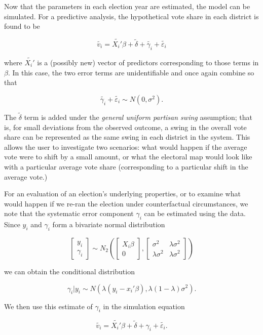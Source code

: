\documentclass[12pt]{article}
\begin{document}
Now that the parameters in each election year are estimated, the model can be simulated. For a predictive analysis, the hypothetical vote share in each district is found to be

\[ \tilde{v_i} = \tilde{X_i'}\beta + \tilde{\delta} + \tilde{\gamma_i} + \tilde{\varepsilon_i} \]

\noindent where $\tilde{X_i'}$ is a (possibly new) vector of predictors corresponding to those terms in $\beta$. In this case, the two error terms are unidentifiable and once again combine so that 

\[ \tilde{\gamma_i} + \tilde{\varepsilon_i} \sim N(0,\sigma^2). \]

The $\tilde{\delta}$ term is added under the \textit{general uniform partisan swing} assumption; that is, for small deviations from the observed outcome, a swing in the overall vote share can be represented as the same swing in each district in the system. This allows the user to investigate two scenarios: what would happen if the average vote were to shift by a small amount, or what the electoral map would look like with a particular average vote share (corresponding to a particular shift in the average vote.)

For an evaluation of an election's underlying properties, or to examine what would happen if we re-ran the election under counterfactual circumstances, we note that the systematic error component $\gamma_i$ can be estimated using the data. Since $y_i$ and $\gamma_i$ form a bivariate normal distribution

\[ \left[ \begin{array}{c} y_i \\ \gamma_i \end{array} \right] \sim N_2 \left( \left[ \begin{array}{c} X_i\beta \\ 0 \end{array} \right], \left[ \begin{array}{cc} \sigma^2 & \lambda \sigma^2 \\ \lambda \sigma^2 & \lambda \sigma^2 \end{array} \right] \right) \]

\noindent we can obtain the conditional distribution

\[ \gamma_i|y_i \sim N(\lambda(y_i-x_i'\beta),\lambda(1-\lambda)\sigma^2). \]

We then use this estimate of $\gamma_i$ in the simulation equation

\[ \tilde{v_i} = \tilde{X_i'}\beta + \tilde{\delta} + \gamma_i + \tilde{\varepsilon_i}. \]
\end{document}
